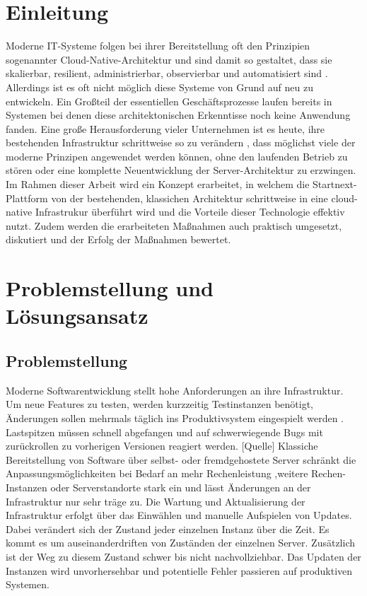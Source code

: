 \documentclass[11pt]{scrartcl}
\begin{document}
\section{Einleitung}

Moderne IT-Systeme folgen bei ihrer Bereitstellung oft den Prinzipien sogenannter Cloud-Native-Architektur
und sind damit so gestaltet, dass sie skalierbar, resilient, administrierbar, observierbar und automatisiert sind \cite{Lee:2021}. 
Allerdings ist es oft nicht möglich diese Systeme von Grund auf neu zu entwickeln. Ein Großteil der essentiellen Geschäftsprozesse 
laufen bereits in Systemen bei denen diese architektonischen Erkenntisse noch keine Anwendung fanden. Eine große Herausforderung vieler 
Unternehmen ist es heute, ihre bestehenden Infrastruktur schrittweise so zu verändern \cite{Fiedelholtz:2021}, dass möglichst viele der 
moderne Prinzipen angewendet werden können, ohne den laufenden Betrieb zu stören oder eine komplette Neuentwicklung der Server-Architektur 
zu erzwingen. Im Rahmen dieser Arbeit wird ein Konzept erarbeitet, in welchem die Startnext-Plattform von der bestehenden, klassichen Architektur 
schrittweise in eine cloud-native Infrastrukur überführt wird und die Vorteile dieser Technologie effektiv nutzt. Zudem werden die erarbeiteten 
Maßnahmen auch praktisch umgesetzt, diskutiert und der Erfolg der Maßnahmen bewertet.

\section{\label{sec:problem_loesung}Problemstellung und Lösungsansatz}
\subsection{Problemstellung}
Moderne Softwarentwicklung stellt hohe Anforderungen an ihre Infrastruktur. Um neue Features zu testen, werden kurzzeitig Testinstanzen benötigt, Änderungen sollen mehrmals täglich ins Produktivsystem eingespielt werden \cite{IBM:2019}. Lastspitzen müssen schnell abgefangen und auf schwerwiegende Bugs mit zurückrollen zu vorherigen Versionen reagiert werden. [Quelle] Klassiche Bereitstellung von Software über selbst- oder fremdgehostete Server schränkt die Anpassungsmöglichkeiten bei Bedarf an mehr Rechenleistung ,weitere Rechen-Instanzen oder Serverstandorte stark ein und lässt Änderungen an der Infrastruktur nur sehr träge zu. \newline Die Wartung und Aktualisierung der Infrastruktur erfolgt über das Einwählen und manuelle Aufspielen von Updates. Dabei verändert sich der Zustand jeder einzelnen Instanz über die Zeit. Es kommt es um auseinanderdriften von Zuständen der einzelnen Server. Zusätzlich ist der Weg zu diesem Zustand schwer bis nicht nachvollziehbar. Das Updaten der Instanzen wird unvorhersehbar und potentielle Fehler passieren auf produktiven Systemen. 
\end{document}
